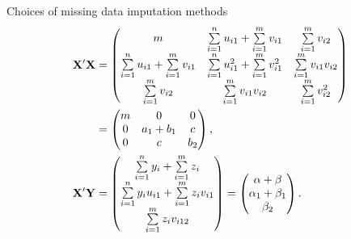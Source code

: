 \begin{frame}{Choices of missing data imputation methods}
\begin{align*}
        \mathbf{X}'\mathbf{X} &= \begin{pmatrix}
            m & \sum\limits_{i=1}^n u_{i1} +\sum\limits_{i=1}^m v_{i1} &\sum\limits_{i=1}^m v_{i2}\\
            \sum\limits_{i=1}^n u_{i1} +\sum\limits_{i=1}^m v_{i1} & \sum\limits_{i=1}^n u_{i1}^2 + \sum\limits_{i=1}^m v_{i1}^2 & \sum\limits_{i=1}^m v_{i1}v_{i2}\\
            \sum\limits_{i=1}^m v_{i2} &\sum\limits_{i=1}^m v_{i1}v_{i2} &\sum\limits_{i=1}^m v_{i2}^2
        \end{pmatrix}\\
        &= \begin{pmatrix}
            m & 0 & 0 \\
            0 & a_1 + b_1 & c\\
            0 & c & b_2
        \end{pmatrix},\\\notag
        \mathbf{X}'\mathbf{Y}&= \begin{pmatrix}
            \sum\limits_{i=1}^n y_i +\sum\limits_{i=1}^m z_i \\ \sum\limits_{i=1}^n y_iu_{i1} +\sum\limits_{i=1}^m z_iv_{i1} \\ \sum\limits_{i=1}^mz_iv_{i12}
        \end{pmatrix}= \begin{pmatrix}
            \alpha + \beta \\ \alpha_1 + \beta_1 \\ \beta_2
        \end{pmatrix}. 
    \end{align*}
\end{frame}

